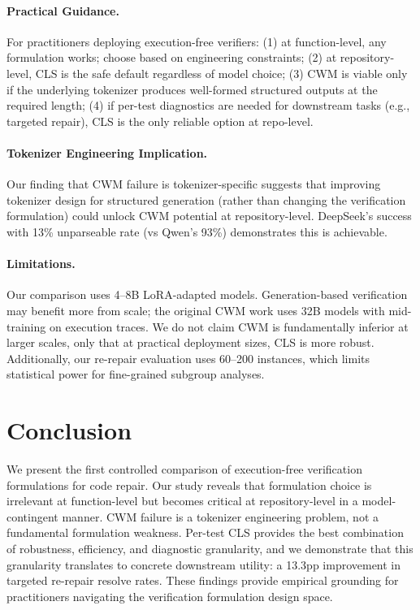 \documentclass[11pt,a4paper]{article}
\begin{document}
\paragraph{Practical Guidance.} For practitioners deploying execution-free verifiers: (1) at function-level, any formulation works; choose based on engineering constraints; (2) at repository-level, CLS is the safe default regardless of model choice; (3) CWM is viable only if the underlying tokenizer produces well-formed structured outputs at the required length; (4) if per-test diagnostics are needed for downstream tasks (e.g., targeted repair), CLS is the only reliable option at repo-level.

\paragraph{Tokenizer Engineering Implication.} Our finding that CWM failure is tokenizer-specific suggests that improving tokenizer design for structured generation (rather than changing the verification formulation) could unlock CWM potential at repository-level. DeepSeek's success with 13\% unparseable rate (vs Qwen's 93\%) demonstrates this is achievable.

\paragraph{Limitations.} Our comparison uses 4--8B LoRA-adapted models. Generation-based verification may benefit more from scale; the original CWM work uses 32B models with mid-training on execution traces. We do not claim CWM is fundamentally inferior at larger scales, only that at practical deployment sizes, CLS is more robust. Additionally, our re-repair evaluation uses 60--200 instances, which limits statistical power for fine-grained subgroup analyses.

\section{Conclusion}

We present the first controlled comparison of execution-free verification formulations for code repair. Our study reveals that formulation choice is irrelevant at function-level but becomes critical at repository-level in a model-contingent manner. CWM failure is a tokenizer engineering problem, not a fundamental formulation weakness. Per-test CLS provides the best combination of robustness, efficiency, and diagnostic granularity, and we demonstrate that this granularity translates to concrete downstream utility: a 13.3pp improvement in targeted re-repair resolve rates. These findings provide empirical grounding for practitioners navigating the verification formulation design space.
\end{document}
